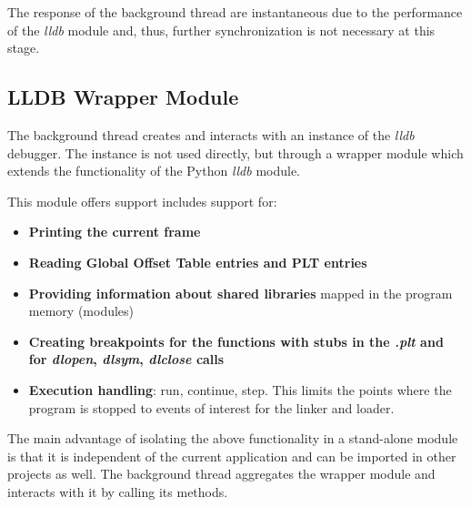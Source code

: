 The response of the background thread are instantaneous due to the performance of the \textit{lldb} module and, thus, further synchronization is not necessary at this stage.

\subsection{LLDB Wrapper Module}

The background thread creates and interacts with an instance of the \textit{lldb} debugger. The instance is not used directly, but through a wrapper module which extends the functionality of the Python \textit{lldb} module.

This module offers support includes support for:
\begin{itemize}
\item \textbf{Printing the current frame}
\item \textbf{Reading Global Offset Table entries and PLT entries}
\item \textbf{Providing information about shared libraries} mapped in the program memory (modules)
\item \textbf{Creating breakpoints for the functions with stubs in the \textit{.plt} and for \textit{dlopen}, \textit{dlsym}, \textit{dlclose} calls}
\item \textbf{Execution handling}: run, continue, step. This limits the points where the program is stopped to events of interest for the linker and loader.
\end{itemize}

The main advantage of isolating the above functionality in a stand-alone module is that it is independent of the current application and can be imported in other projects as well. The background thread aggregates the wrapper module and interacts with it by calling its methods.
